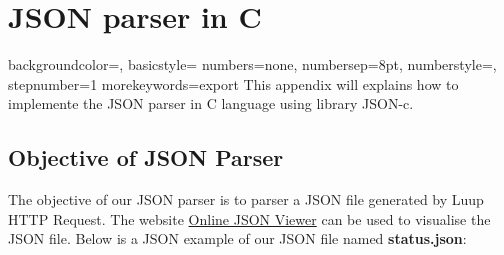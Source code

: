 
\chapter{JSON parser in C} %

\label{AppendixB} %

{
    backgroundcolor=\color{black},
    basicstyle=\scriptsize\color{white}\ttfamily
    numbers=none,
    numbersep=8pt,                   %
    numberstyle=\tiny\color{white}, %
    stepnumber=1                    %
}
{
  morekeywords={export}
}
This appendix will explains how to implemente the JSON parser in C language using library JSON-c.
\section{Objective of JSON Parser}
The objective of our JSON parser is to parser a JSON file generated by Luup HTTP Request. The website \href{http://www.wikibooks.org}{Online JSON Viewer} can be used to visualise the JSON file. Below is a JSON example of our JSON file named \textbf{status.json}:


